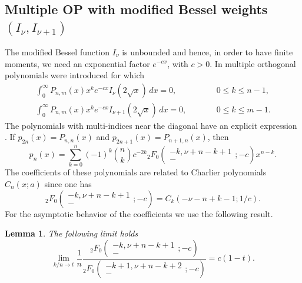 \documentclass[12pt]{article}
\newtheorem{lemma}{Lemma}[theorem]
\numberwithin{equation}{section}
\begin{document}
\subsection{Multiple OP with modified Bessel weights $(I_\nu,I_{\nu+1})$}
The modified Bessel function $I_\nu$ is unbounded and hence, in order to have finite moments, we need an exponential factor $e^{-cx}$, with $c>0$.
In \cite{Coussement-WVA1} multiple orthogonal polynomials were introduced for which
\begin{eqnarray*}
   \int_0^\infty  P_{n,m}(x) x^k e^{-cx} I_\nu(2\sqrt{x}) \,dx = 0,  &&  \qquad 0 \leq k \leq n-1, \\
  \int_0^\infty  P_{n,m}(x) x^k e^{-cx} I_{\nu+1}(2\sqrt{x}) \,dx = 0,  &&  \qquad 0 \leq k \leq m-1. 
\end{eqnarray*}
The polynomials with multi-indices near the diagonal have an explicit expression \cite{Coussement-WVA1}. If $p_{2n}(x) = P_{n,n}(x)$ and
$p_{2n+1}(x) = P_{n+1,n}(x)$, then
\[     p_n(x) = \sum_{k=0}^n (-1)^k \binom{n}{k} c^{-2k}  {}_2F_0\left( \begin{array}{c}   -k, \nu+n-k+1 \\  - \end{array}; -c  \right) x^{n-k}.  \]
The coefficients of these polynomials are related to Charlier polynomials $C_n(x;a)$ \cite[\S 9.14]{koekoek} since one has
\begin{equation}  \label{coefCharlier}
   {}_2F_0\left( \begin{array}{c}   -k, \nu+n-k+1 \\  - \end{array}; -c  \right) = C_k(-\nu-n+k-1;1/c) .
\end{equation}
For the asymptotic behavior of the coefficients we use the following result.

\begin{lemma}
The following limit holds
\[    \lim_{k/n \to t}   \frac{1}{n}  \frac{{}_2F_0\left( \begin{array}{c}   -k, \nu+n-k+1 \\  - \end{array}; -c  \right)}
                                                               { {}_2F_0\left( \begin{array}{c}   -k+1, \nu+n-k+2 \\  - \end{array}; -c  \right)}  = c (1-t).    \]
\end{lemma}
\end{document}
